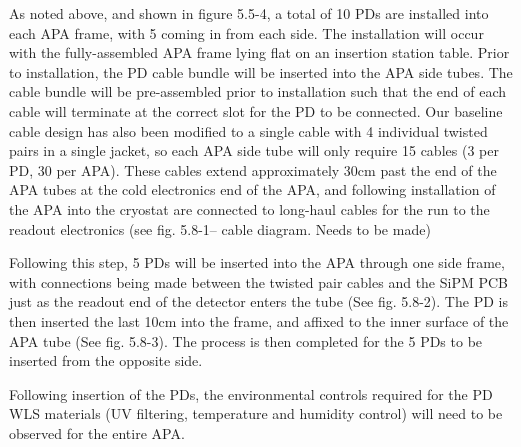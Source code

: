 As noted above, and shown in figure 5.5-4, a total of 10 PDs are
installed into each APA frame, with 5 coming in from each side.  The
installation will occur with the fully-assembled APA frame lying flat
on an insertion station table.  Prior to installation, the PD cable
bundle will be inserted into the APA side tubes.  The cable bundle
will be pre-assembled prior to installation such that the end of each
cable will terminate at the correct slot for the PD to be connected.
Our baseline cable design has also been modified to a single cable
with 4 individual twisted pairs in a single jacket, so each APA side
tube will only require 15 cables (3 per PD, 30 per APA).  These cables
extend approximately 30cm past the end of the APA tubes at the cold
electronics end of the APA, and following installation of the APA into
the cryostat are connected to long-haul cables for the run to the
readout electronics (see fig. 5.8-1-- cable diagram.  Needs to be
made)

Following this step, 5 PDs will be inserted into the APA through one
side frame, with connections being made between the twisted pair
cables and the SiPM PCB just as the readout end of the detector enters
the tube (See fig. 5.8-2).  The PD is then inserted the last 10cm into
the frame, and affixed to the inner surface of the APA tube (See
fig. 5.8-3).  The process is then completed for the 5 PDs to be
inserted from the opposite side.

Following insertion of the PDs, the environmental controls required
for the PD WLS materials (UV filtering, temperature and humidity
control) will need to be observed for the entire APA.







